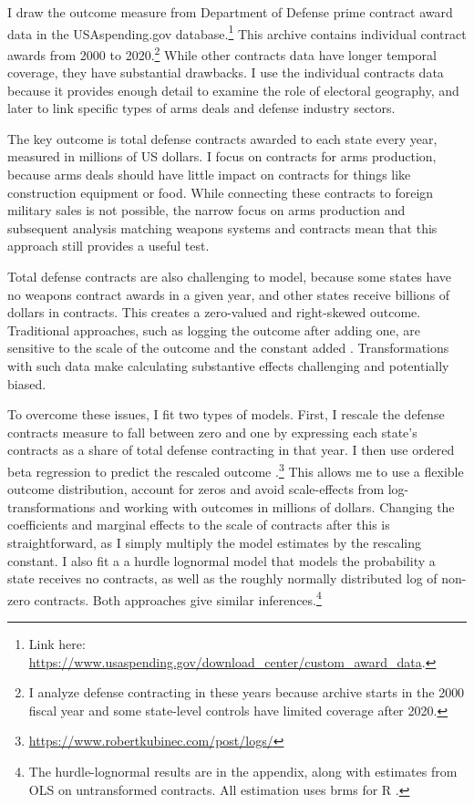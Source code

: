 \documentclass[12pt]{article}
\begin{document}
I draw the outcome measure from Department of Defense prime contract award data in the USAspending.gov database.\footnote{Link here: \url{https://www.usaspending.gov/download_center/custom_award_data}.} 
This archive contains individual contract awards from 2000 to 2020.\footnote{I analyze defense contracting in these years because archive starts in the 2000 fiscal year and some state-level controls have limited coverage after 2020.}
While other contracts data have longer temporal coverage, they have substantial drawbacks.
I use the individual contracts data because it provides enough detail to examine the role of electoral geography, and later to link specific types of arms deals and defense industry sectors. 


The key outcome is total defense contracts awarded to each state every year, measured in millions of US dollars.
I focus on contracts for arms production, because arms deals should have little impact on contracts for things like construction equipment or food.
While connecting these contracts to foreign military sales is not possible, the narrow focus on arms production and subsequent analysis matching weapons systems and contracts mean that this approach still provides a useful test. 


Total defense contracts are also challenging to model, because some states have no weapons contract awards in a given year, and other states receive billions of dollars in contracts. 
This creates a zero-valued and right-skewed outcome. 
Traditional approaches, such as logging the outcome after adding one, are sensitive to the scale of the outcome and the constant added \citep{ChenRoth2022, MullahyNorton2022}. 
Transformations with such data make calculating substantive effects challenging and potentially biased. 


To overcome these issues, I fit two types of models.
First, I rescale the defense contracts measure to fall between zero and one by expressing each state's contracts as a share of total defense contracting in that year.
I then use ordered beta regression to predict the rescaled outcome \citep{Kubinec2022}.\footnote{\url{https://www.robertkubinec.com/post/logs/}} 
This allows me to use a flexible outcome distribution, account for zeros and avoid scale-effects from log-transformations and working with outcomes in millions of dollars. 
Changing the coefficients and marginal effects to the scale of contracts after this is straightforward, as I simply multiply the model estimates by the rescaling constant.
I also fit a a hurdle lognormal model that models the probability a state receives no contracts, as well as the roughly normally distributed log of non-zero contracts. 
Both approaches give similar inferences.\footnote{The hurdle-lognormal results are in the appendix, along with estimates from OLS on untransformed contracts. All estimation uses brms for \textsf{R} \citep{Buerkner2017}.} 
\end{document}
